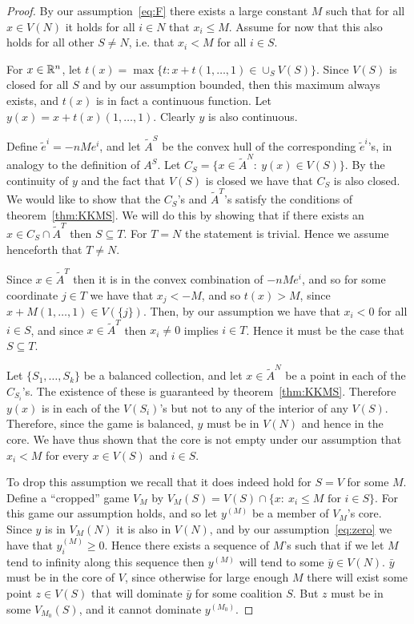 \documentclass[11pt]{article} \usepackage{amssymb}
\begin{document}
\begin{proof}
  By our assumption~\eqref{eq:F} there exists a large constant $M$
  such that for all $x \in V(N)$ it holds for all $i \in N$ that $x_i
  \leq M$. Assume for now that this also holds for all other $S \neq
  N$, i.e. that $x_i < M$ for all $i \in S$.

  For $x \in \mathbb R^n$, let $t(x) = \max\{t: x+t(1,\ldots, 1) \in \cup_S
  V(S)\}$. Since $V(S)$ is closed for all $S$ and by our assumption
  bounded, then this maximum always exists, and $t(x)$ is in fact a
  continuous function. Let $y(x) = x+t(x)(1, \ldots, 1)$. Clearly $y$
  is also continuous.

  Define $\tilde{e}^i = -nMe^i$, and let $\tilde{A}^S$ be the convex
  hull of the corresponding $\tilde{e}^i$'s, in analogy to the
  definition of $A^S$.  Let $C_S = \{x \in \tilde{A}^N:\: y(x) \in
  V(S)\}$. By the continuity of $y$ and the fact that $V(S)$ is closed
  we have that $C_S$ is also closed. We would like to show that the
  $C_S$'s and $\tilde{A}^T$'s satisfy the conditions of
  theorem~\ref{thm:KKMS}. We will do this by showing that if there
  exists an $x \in C_S \cap \tilde{A}^T$ then $S \subseteq T$. For
  $T=N$ the statement is trivial. Hence we assume henceforth that $T
  \neq N$.

  Since $x \in \tilde{A}^T$ then it is in the convex combination of
  $-nMe^i$, and so for some coordinate $j \in T$ we have that $x_j <
  -M$, and so $t(x) > M$, since $x+M(1,\ldots,1) \in V(\{j\})$. Then,
  by our assumption we have that $x_i <0$ for all $i \in S$, and since
  $x \in \tilde{A}^T$ then $x_i \neq 0$ implies $i \in T$. Hence it
  must be the case that $S \subseteq T$.

  Let $\{S_1, \ldots, S_k\}$ be a balanced collection, and let $x \in
  \tilde{A}^N$ be a point in each of the $C_{S_i}$'s. The existence of
  these is guaranteed by theorem~\ref{thm:KKMS}. Therefore $y(x)$ is
  in each of the $V(S_i)$'s but not to any of the interior of any
  $V(S)$.  Therefore, since the game is balanced, $y$ must be in
  $V(N)$ and hence in the core. We have thus shown that the core is
  not empty under our assumption that $x_i < M$ for every $x \in V(S)$
  and $i \in S$.

  To drop this assumption we recall that it does indeed hold for $S=V$
  for some $M$. Define a ``cropped'' game $V_M$ by $V_M(S)=V(S) \cap
  \{x :\: x_i \leq M \mbox{ for } i \in S\}$. For this game our
  assumption holds, and so let $y^{(M)}$ be a member of $V_M$'s
  core. Since $y$ is in $V_M(N)$ it is also in $V(N)$, and by our
  assumption~\ref{eq:zero} we have that $y^{(M)}_i \geq 0$. Hence
  there exists a sequence of $M$'s such that if we let $M$ tend to
  infinity along this sequence then $y^{(M)}$ will tend to some
  $\bar{y} \in V(N)$. $\bar{y}$ must be in the core of $V$, since
  otherwise for large enough $M$ there will exist some point $z \in
  V(S)$ that will dominate $\bar{y}$ for some coalition $S$. But $z$
  must be in some $V_{M_0}(S)$, and it cannot dominate $y^{(M_0)}$.
  
\end{proof}


 
\end{document}
